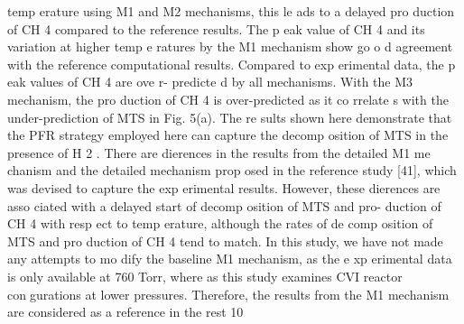\documentclass[10pt, letterpaper]{article}
\begin{document}
temp erature using M1 and M2 mechanisms, this le ads to a delayed pro duction of CH
4
compared to the
reference results. The p eak value of CH
4
and its variation at higher temp e ratures by the M1 mechanism
show go o d agreement with the reference computational results. Compared to exp erimental data, the p eak
values of CH
4
are ove r- predicte d by all mechanisms. With the M3 mechanism, the pro duction of CH
4
is
over-predicted as it co rrelate s with the under-prediction of MTS in Fig. 5(a).
The re sults shown here demonstrate that the PFR strategy employed here can capture the decomp osition
of MTS in the presence of H
2
. There are dierences in the results from the detailed M1 me chanism and
the detailed mechanism prop osed in the reference study [41], which was devised to capture the exp erimental
results. However, these dierences are asso ciated with a delayed start of decomp osition of MTS and pro-
duction of CH
4
with resp ect to temp erature, although the rates of de comp osition of MTS and pro duction of
CH
4
tend to match. In this study, we have not made any attempts to mo dify the baseline M1 mechanism, as
the e xp erimental data is only available at 760 Torr, where as this study examines CVI reactor congurations
at lower pressures. Therefore, the results from the M1 mechanism are considered as a reference in the rest
10
\end{document}
